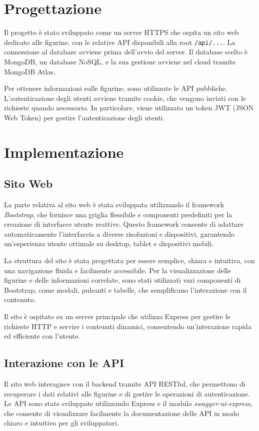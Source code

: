\documentclass{article}
\begin{document}
\section{Progettazione}
Il progetto è stato sviluppato come un server HTTPS che ospita un sito web dedicato alle figurine, con le relative API disponibili alla root \texttt{/api/...}. La connessione al database avviene prima dell'avvio del server. Il database scelto è MongoDB, un database NoSQL, e la sua gestione avviene nel cloud tramite MongoDB Atlas.

Per ottenere informazioni sulle figurine, sono utilizzate le API pubbliche. L'autenticazione degli utenti avviene tramite cookie, che vengono inviati con le richieste quando necessario. In particolare, viene utilizzato un token JWT (JSON Web Token) per gestire l'autenticazione degli utenti.

    
\section*{Implementazione}

    \subsection*{Sito Web}
    La parte relativa al sito web è stata sviluppata utilizzando il framework \textit{Bootstrap}, che fornisce una griglia flessibile e componenti predefiniti per la creazione di interfacce utente reattive. Questo framework consente di adattare automaticamente l'interfaccia a diverse risoluzioni e dispositivi, garantendo un'esperienza utente ottimale su desktop, tablet e dispositivi mobili. 
    
    La struttura del sito è stata progettata per essere semplice, chiara e intuitiva, con una navigazione fluida e facilmente accessibile. Per la visualizzazione delle figurine e delle informazioni correlate, sono stati utilizzati vari componenti di Bootstrap, come modali, pulsanti e tabelle, che semplificano l'interazione con il contenuto.
    
    Il sito è ospitato su un server principale che utilizza Express per gestire le richieste HTTP e servire i contenuti dinamici, consentendo un'interazione rapida ed efficiente con l'utente.
    
    \subsection*{Interazione con le API}
    Il sito web interagisce con il backend tramite API RESTful, che permettono di recuperare i dati relativi alle figurine e di gestire le operazioni di autenticazione. Le API sono state sviluppate utilizzando Express e il modulo \textit{swagger-ui-express}, che consente di visualizzare facilmente la documentazione delle API in modo chiaro e intuitivo per gli sviluppatori.
    
\end{document}
